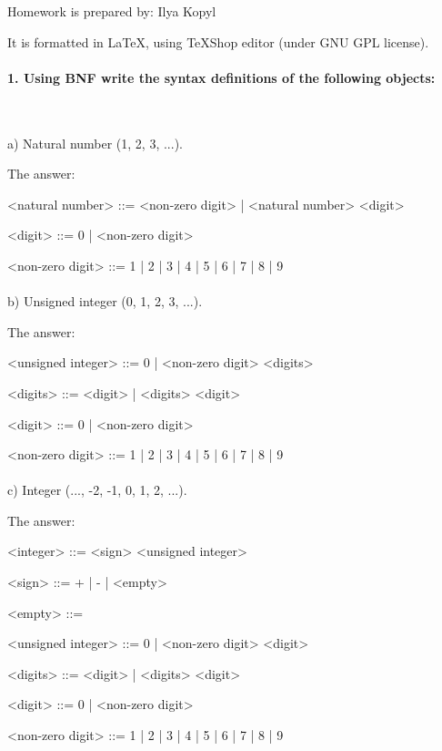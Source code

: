 \documentclass{article}
\begin{document}
Homework is prepared by: Ilya Kopyl

It is formatted in LaTeX, using TeXShop editor (under GNU GPL license).


	\setlength{\grammarparsep}{5pt plus 1pt minus 1pt} %
	\setlength{\grammarindent}{12em} %


	\paragraph{1. Using BNF write the syntax definitions of the following objects:}
	\rmfamily\
	\newline

			a) Natural number (1, 2, 3, ...).
			
			The answer:
	\ttfamily
	\begin{grammar}
	
		<natural number> ::= <non-zero digit> | <natural number> <digit>

		<digit> ::= 0 | <non-zero digit>

		<non-zero digit> ::= 1 | 2 | 3 | 4 | 5 | 6 | 7 | 8 | 9
		
	\end{grammar}
	
	
	\paragraph{}
	\rmfamily
	
			b) Unsigned integer (0, 1, 2, 3, ...).
			
			The answer:
	\ttfamily
	\begin{grammar}
		
		<unsigned integer> ::= 0 | <non-zero digit> <digits>
		
		<digits> ::= <digit> | <digits> <digit>

		<digit> ::= 0 | <non-zero digit>

		<non-zero digit> ::= 1 | 2 | 3 | 4 | 5 | 6 | 7 | 8 | 9
		
	\end{grammar}


	\paragraph{}
	\rmfamily
	
			c) Integer (..., -2, -1, 0, 1, 2, ...).
			
			The answer:
	\ttfamily
	\begin{grammar}
		
		<integer> ::= <sign> <unsigned integer>
		
		<sign> ::= + | - | <empty>
		
		<empty> ::= \
		
		<unsigned integer> ::= 0 | <non-zero digit> <digit>
				
		<digits> ::= <digit> | <digits> <digit>

		<digit> ::= 0 | <non-zero digit>
		
		<non-zero digit> ::= 1 | 2 | 3 | 4 | 5 | 6 | 7 | 8 | 9

		
	\end{grammar}
\end{document}
